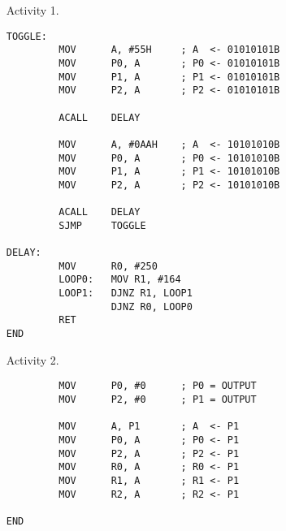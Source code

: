 \documentclass[9pt]{article}
\begin{document}
\begin{enumerate}
   \item[Activity 1.] \begin{verbatim}
TOGGLE:
         MOV      A, #55H     ; A  <- 01010101B
         MOV      P0, A       ; P0 <- 01010101B
         MOV      P1, A       ; P1 <- 01010101B
         MOV      P2, A       ; P2 <- 01010101B
         
         ACALL    DELAY
         
         MOV      A, #0AAH    ; A  <- 10101010B
         MOV      P0, A       ; P0 <- 10101010B
         MOV      P1, A       ; P1 <- 10101010B
         MOV      P2, A       ; P2 <- 10101010B
         
         ACALL    DELAY			
         SJMP     TOGGLE
			
DELAY:
         MOV      R0, #250			
         LOOP0:   MOV R1, #164		
         LOOP1:   DJNZ R1, LOOP1
                  DJNZ R0, LOOP0
         RET
END
         \end{verbatim}
   \item[Activity 2.] \begin{verbatim}
         MOV      P0, #0      ; P0 = OUTPUT
         MOV      P2, #0      ; P1 = OUTPUT

         MOV      A, P1       ; A  <- P1
         MOV      P0, A       ; P0 <- P1
         MOV      P2, A       ; P2 <- P1
         MOV      R0, A       ; R0 <- P1
         MOV      R1, A       ; R1 <- P1
         MOV      R2, A       ; R2 <- P1

END
         \end{verbatim}
\end{enumerate}
\end{document}
